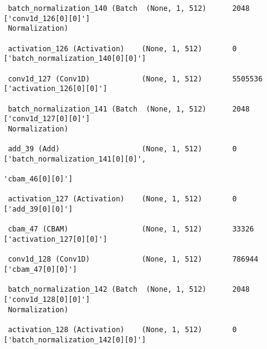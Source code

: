 \begin{lstlisting}
 batch_normalization_140 (Batch  (None, 1, 512)      2048        ['conv1d_126[0][0]']             
 Normalization)                                                                                   
                                                                                                  
 activation_126 (Activation)    (None, 1, 512)       0           ['batch_normalization_140[0][0]']
                                                                                                  
 conv1d_127 (Conv1D)            (None, 1, 512)       5505536     ['activation_126[0][0]']         
                                                                                                  
 batch_normalization_141 (Batch  (None, 1, 512)      2048        ['conv1d_127[0][0]']             
 Normalization)                                                                                   
                                                                                                  
 add_39 (Add)                   (None, 1, 512)       0           ['batch_normalization_141[0][0]',
                                                                  'cbam_46[0][0]']                
                                                                                                  
 activation_127 (Activation)    (None, 1, 512)       0           ['add_39[0][0]']                 
                                                                                                  
 cbam_47 (CBAM)                 (None, 1, 512)       33326       ['activation_127[0][0]']         
                                                                                                  
 conv1d_128 (Conv1D)            (None, 1, 512)       786944      ['cbam_47[0][0]']                
                                                                                                  
 batch_normalization_142 (Batch  (None, 1, 512)      2048        ['conv1d_128[0][0]']             
 Normalization)                                                                                   
                                                                                                  
 activation_128 (Activation)    (None, 1, 512)       0           ['batch_normalization_142[0][0]']
                                                                                                  

\end{lstlisting}
